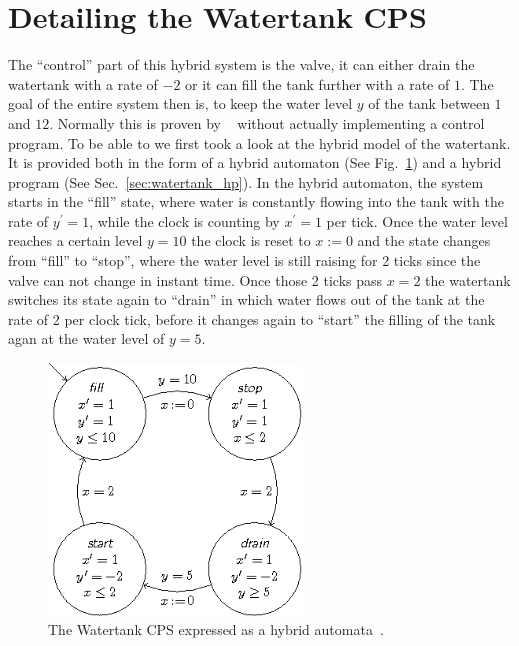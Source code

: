 \section{Detailing the Watertank CPS}
\label{sec:watertank:detail}

The ``control'' part of this hybrid system is the valve, it can either drain the watertank with a rate of \(-2\) or it can fill the tank further with a rate of \(1\). The goal of the entire system then is, to keep the water level \(y\) of the tank between \(1\) and \(12\). Normally this is proven by \keym~ without actually implementing a control program. To be able to  we first took a look at the hybrid model of the watertank. It is provided both in the form of a hybrid automaton (See Fig.~\ref{fig:watertank_ha}) and a hybrid program (See Sec.~\ref{sec:watertank_hp}). In the hybrid automaton, the system starts in the ``fill'' state, where water is constantly flowing into the tank with the rate of \(y^{\prime} = 1\), while the clock is counting by \(x^{\prime}=1\) per tick. Once the water level reaches a certain level \(y=10\) the clock is reset to \(x:=0\) and the state changes from ``fill'' to ``stop'', where the water level is still raising for 2 ticks since the valve can not change in instant time. Once those 2 ticks pass \(x=2\) the watertank switches its state again to ``drain'' in which water flows out of the tank at the rate of 2 per clock tick, before it changes again to ``start'' the filling of the tank agan at the water level of \(y=5\).
\begin{figure}
	\centering
	\includegraphics[width=0.6\textwidth]{images/watertank_ha}
	\caption{The Watertank CPS expressed as a hybrid automata~\cite{keymaeraGuide}.}
	\label{fig:watertank_ha}
\end{figure}

